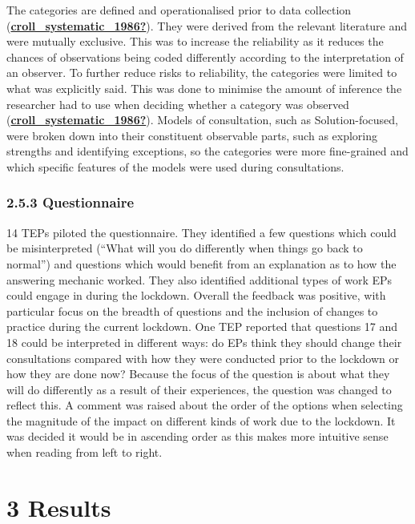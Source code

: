 \documentclass[
]{article}
\begin{document}
The categories are defined and operationalised prior to data collection
(\protect\hyperlink{ref-croll_systematic_1986}{\textbf{croll\_systematic\_1986?}}).
They were derived from the relevant literature and were mutually
exclusive. This was to increase the reliability as it reduces the
chances of observations being coded differently according to the
interpretation of an observer. To further reduce risks to reliability,
the categories were limited to what was explicitly said. This was done
to minimise the amount of inference the researcher had to use when
deciding whether a category was observed
(\protect\hyperlink{ref-croll_systematic_1986}{\textbf{croll\_systematic\_1986?}}).
Models of consultation, such as Solution-focused, were broken down into
their constituent observable parts, such as exploring strengths and
identifying exceptions, so the categories were more fine-grained and
which specific features of the models were used during consultations.

\hypertarget{questionnaire-2}{%
\subsubsection{2.5.3 Questionnaire}\label{questionnaire-2}}

14 TEPs piloted the questionnaire. They identified a few questions which
could be misinterpreted (``What will you do differently when things go
back to normal'') and questions which would benefit from an explanation
as to how the answering mechanic worked. They also identified additional
types of work EPs could engage in during the lockdown. Overall the
feedback was positive, with particular focus on the breadth of questions
and the inclusion of changes to practice during the current lockdown.
One TEP reported that questions 17 and 18 could be interpreted in
different ways: do EPs think they should change their consultations
compared with how they were conducted prior to the lockdown or how they
are done now? Because the focus of the question is about what they will
do differently as a result of their experiences, the question was
changed to reflect this. A comment was raised about the order of the
options when selecting the magnitude of the impact on different kinds of
work due to the lockdown. It was decided it would be in ascending order
as this makes more intuitive sense when reading from left to right.

\hypertarget{results}{%
\section{3 Results}\label{results}}
\end{document}
